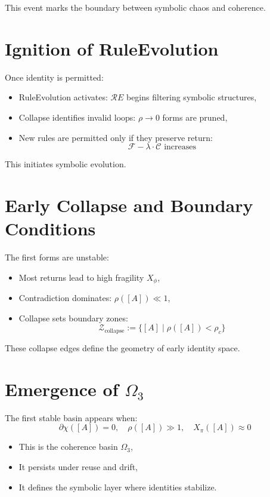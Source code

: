 This event marks the boundary between symbolic chaos and coherence.

\section{Ignition of RuleEvolution} \label{sec:re-ignition}

Once identity is permitted:
\begin{itemize}
  \item RuleEvolution activates: $\mathcal{R}E$ begins filtering symbolic structures,
  \item Collapse identifies invalid loops: $\rho \to 0$ forms are pruned,
  \item New rules are permitted only if they preserve return:
  \[
  \mathcal{F} - \lambda \cdot \mathcal{C} \text{ increases}
  \]
\end{itemize}

This initiates symbolic evolution.

\section{Early Collapse and Boundary Conditions} \label{sec:collapse-early}

The first forms are unstable:
\begin{itemize}
  \item Most returns lead to high fragility $X_\phi$,
  \item Contradiction dominates: $\rho([A]) \ll 1$,
  \item Collapse sets boundary zones:
  \[
  \mathcal{Z}_{\text{collapse}} := \{ [A] \mid \rho([A]) < \rho_c \}
  \]
\end{itemize}

These collapse edges define the geometry of early identity space.

\section{Emergence of $\Omega_3$} \label{sec:omega3-emergence}

The first stable basin appears when:
\[
\partial\chi([A]) = 0,\quad \rho([A]) \gg 1,\quad X_\pi([A]) \approx 0
\]

\begin{itemize}
  \item This is the coherence basin $\Omega_3$,
  \item It persists under reuse and drift,
  \item It defines the symbolic layer where identities stabilize.
\end{itemize}


